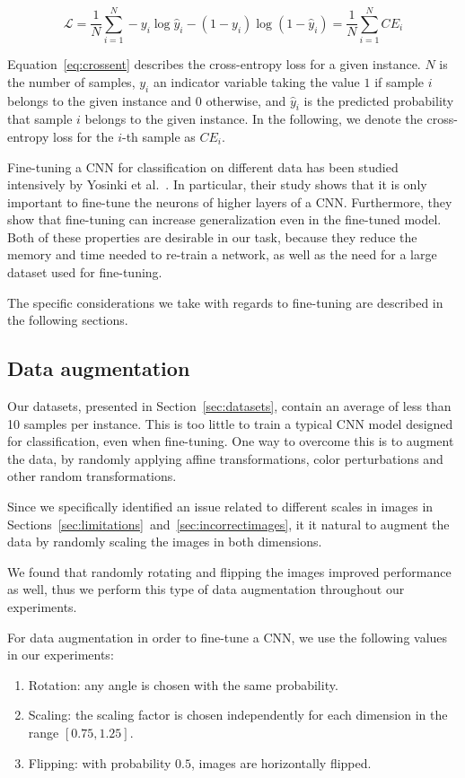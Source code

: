 \begin{equation}\label{eq:crossent}
\mathcal{L} = \frac{1}{N}
\sum_{i=1}^N -y_i \log \hat{y}_i - (1-y_i) \log (1-\hat{y}_i)
= \frac{1}{N} \sum_{i=1}^N \mathit{CE}_i
\end{equation}

Equation~\ref{eq:crossent} describes the cross-entropy loss for a
given instance. $N$ is the number of samples, $y_i$ an indicator
variable taking the value $1$ if sample $i$ belongs to the given
instance and $0$ otherwise, and $\hat{y}_i$ is the predicted probability
that sample $i$ belongs to the given instance. In the following,
we denote the cross-entropy loss for the $i$-th sample as
$\mathit{CE}_i$.

Fine-tuning a CNN for classification on different data has been studied
intensively by Yosinki et al.~\cite{yosinski_how_2014}. In particular,
their study shows that it is only important to fine-tune the neurons
of higher layers of a CNN. Furthermore, they show that
fine-tuning can increase generalization even in the fine-tuned model.
Both of these properties are desirable in our task, because they reduce
the memory and time needed to re-train a network, as well as the need
for a large dataset used for fine-tuning.

The specific considerations we take with regards to fine-tuning are
described in the following sections.

\subsection{Data augmentation}
Our datasets, presented in Section~\ref{sec:datasets},
contain an average of less than 10 samples per instance. This is too little
to train a typical CNN model designed for classification, even when
fine-tuning.
One way to overcome this is to augment the data, by randomly applying
affine transformations, color perturbations and other random transformations.

Since we specifically identified an issue related to different scales
in images in Sections~\ref{sec:limitations}~and~\ref{sec:incorrectimages},
it it natural to augment the data by randomly scaling the images in both
dimensions.

We found that randomly rotating and flipping the images improved
performance as well, thus we perform this type of data augmentation
throughout our experiments.

For data augmentation in order to fine-tune a CNN, we use the
following values in our experiments:
\begin{enumerate}
    \item Rotation: any angle is chosen with the same probability.
    \item Scaling: the scaling factor is chosen independently for each
    dimension in the range $[0.75,1.25]$.
    \item Flipping: with probability $0.5$, images are horizontally
    flipped.
\end{enumerate}

